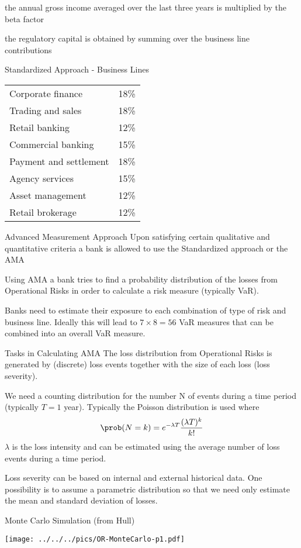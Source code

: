 	the annual gross income averaged over the last three years is multiplied by the beta factor
	
	the regulatory capital is obtained by summing over the business line contributions


Standardized Approach - Business Lines
\begin{tabular}{ll}
Corporate finance & 18\%\\
Trading and sales & 18\%\\
Retail banking & 12\%\\
Commercial banking & 15\%\\
Payment and settlement & 18\%\\
Agency services & 15\%\\
Asset management & 12\%\\
Retail brokerage & 12\%\\
\end{tabular}


Advanced Measurement Approach
	Upon satisfying certain qualitative and quantitative criteria a bank 
	is allowed to use the Standardized approach or the AMA
	
	Using AMA a bank tries to find a probability distribution of the losses 
	from Operational Risks in order to calculate a risk measure (typically VaR).
	
	Banks need to estimate their exposure to each combination of type of risk and business line. 
	Ideally this will lead to $7 \times 8=56$ VaR measures that can be combined into an overall VaR measure.


Tasks in Calculating AMA
	The loss distribution from Operational Risks is generated by (discrete) loss events 
	together with the size of each loss (loss severity).
	
	We need a counting distribution for the number N of events during a time period (typically $T=1$ year). 
	Typically the Poisson distribution is used where
		$$
		\prob(N=k) = e^{-\lambda T}\frac{(\lambda T)^k}{k!}
		$$
	$\lambda$ is the loss intensity and can be estimated using the average number of loss events during a time period.
 
	Loss severity can be based on internal and external historical data. One possibility is to assume a 
	parametric distribution so that we need only estimate the mean and standard deviation of losses.


Monte Carlo Simulation (from Hull)
	\begin{center}
	\texttt{[image: ../../../pics/OR-MonteCarlo-p1.pdf]}
	\end{center}
	

